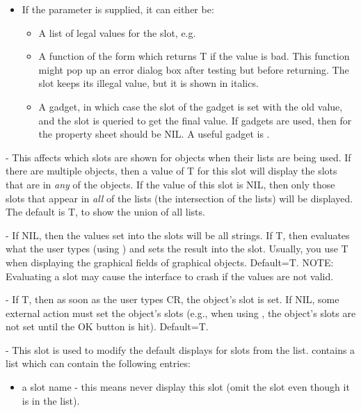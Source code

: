 \begin{description}
\begin{itemize}
\item If the  parameter is supplied, it can either be:

\begin{itemize}
\item A list of legal values for the slot, e.g.

\item A function of the form  which returns T if the
value is bad.  This function might pop up an error dialog box after
testing but before returning.  The slot keeps its illegal value, but
it is shown in italics.

\item A gadget, in which case the  slot of the gadget is set with
the old value, and the  slot is queried to get the final value.
If gadgets are used, then  for the property
sheet should be NIL.  A useful gadget is
.
\end{itemize}

\end{itemize}


\item[]  - This affects which slots are shown for objects when their
 lists are being used.  If there are multiple objects, then
a value of T for this slot will display the slots that are in {\it any} of
the objects.  If the value of this slot is NIL, then only those slots that
appear in {\it all} of the  lists (the intersection of the lists)
will be displayed.  The default is T, to show the union of all 
lists.

\item[]  - If NIL, then the values set into the slots will be all strings.
If T, then evaluates what the user types (using
) and sets the result into the slot.  Usually,
you use T when displaying the graphical fields of graphical
objects.  Default=T.  NOTE: Evaluating a slot may cause the
interface to crash if the values are not valid.

\item[]  - If T, then as soon as the user types CR, the object's
slot is set.  If NIL, some external action must set the object's
slots (e.g., when using , the object's
slots are not set until the OK button is hit).  Default=T.

\item[]  - This slot is used to
modify the default displays for slots from the  list.
 contains a list which can contain the following entries:
\begin{itemize}
\item a slot name - this means never display this slot (omit the slot even
though it is in the  list).


\end{itemize}
\end{description}
